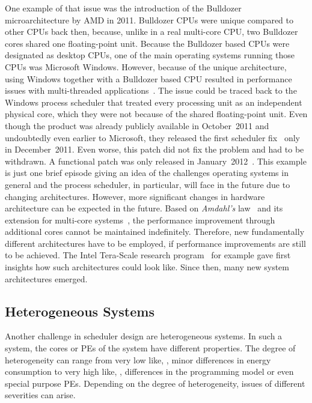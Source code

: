 One example of that issue was the introduction of the Bulldozer microarchitecture by AMD in 2011. Bulldozer CPUs were unique compared to other CPUs back then, because, unlike in a real multi-core CPU, two Bulldozer cores shared one floating-point unit. Because the Bulldozer based CPUs were designated as desktop CPUs, one of the main operating systems running those CPUs was Microsoft Windows. However, because of the unique architecture, using Windows together with a Bulldozer based CPU resulted in performance issues with multi-threaded applications~\cite{Angelini-2011-Bulldozer}. The issue could be traced back to the Windows process scheduler that treated every processing unit as an independent physical core, which they were not because of the shared floating-point unit. Even though the product was already publicly available in October~2011 and undoubtedly even earlier to Microsoft, they released the first scheduler fix~\cite{Microsoft-2011-PatchBulldozer-A} only in December~2011. Even worse, this patch did not fix the problem and had to be withdrawn. A functional patch was only released in January~2012~\cite{Microsoft-2012-PatchBulldozer-B, Microsoft-2012-PatchBulldozer-C}. This example is just one brief episode giving an idea of the challenges operating systems in general and the process scheduler, in particular, will face in the future due to changing architectures. However, more significant changes in hardware architecture can be expected in the future. Based on \emph{Amdahl's} law~\cite{Amdahl-1967-Law} and its extension for multi-core systems~\cite{Hill-2008-AmdahlMC}, the performance improvement through additional cores cannot be maintained indefinitely. Therefore, new fundamentally different architectures have to be employed, if performance improvements are still to be achieved. The Intel Tera-Scale research program~\cite{Intel-2006-TerraScale} for example gave first insights how such architectures could look like. Since then, many new system architectures emerged.

\subsection{Heterogeneous Systems}%
\label{sec:intro:challenges:hetero}

Another challenge in scheduler design are heterogeneous systems. In such a system, the cores or \acp{PE} of the system have different properties. The degree of heterogeneity can range from very low like, \eg, minor differences in energy consumption to very high like, \eg, differences in the programming model or even special purpose \acp{PE}. Depending on the degree of heterogeneity, issues of different severities can arise.

